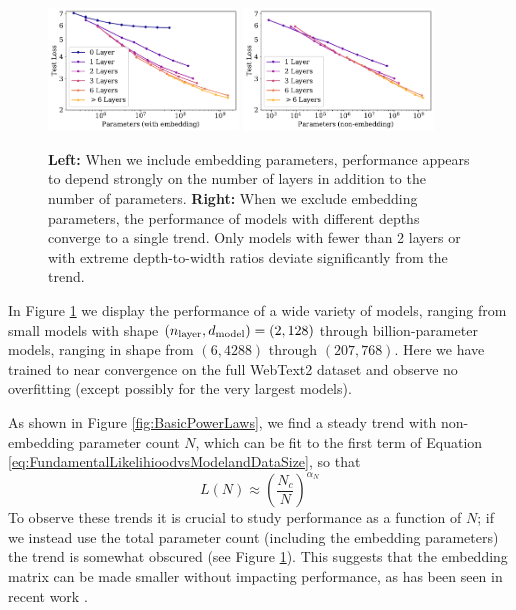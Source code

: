\documentclass[english]{article}
\newcommand{\be}{\begin{equation}}
\newcommand{\ee}{\end{equation}}
\begin{document}
\begin{figure}
\noindent \centering{}
\includegraphics[width=0.45\textwidth]{PerfVsModelSizeAllParams}
\includegraphics[width=0.45\textwidth]{PerfVsModelSizeNonEmbed}
\caption[Comparison of performance trend when including or excluding embeddings]{
{\bf Left:} When we include embedding parameters, performance appears to depend strongly on the number of layers in addition to the number of parameters.
{\bf Right:} When we exclude embedding parameters, the performance of models with different depths converge to a single trend. Only models with fewer than 2 layers or with extreme depth-to-width ratios deviate significantly from the trend.  \label{fig:PerformancevsModelSizeBody}}
\end{figure}


In Figure \ref{fig:PerformancevsModelSizeBody} we display the performance of a wide variety of models, ranging from small models with shape $(n_{\rm layer}, d_{{\rm model}}) = (2, 128)$ through billion-parameter models, ranging in shape from $(6, 4288)$ through $(207, 768)$.  Here we have trained to near convergence on the full WebText2 dataset and observe no overfitting (except possibly for the very largest models).

As shown in  Figure \ref{fig:BasicPowerLaws}, we find a steady trend with non-embedding parameter count $N$, which can be fit to the first term of Equation \eqref{eq:FundamentalLikelihioodvsModelandDataSize}, so that
\be
L(N) \approx \left( \frac{N_c}{N} \right)^{ \alpha_N }
\ee  
To observe these trends it is crucial to study performance as a function of $N$; if we instead use the total parameter count (including the embedding parameters) the trend is somewhat obscured (see Figure \ref{fig:PerformancevsModelSizeBody}).  This suggests that the embedding matrix can be made smaller without impacting performance, as has been seen in recent work \cite{lan2019albert}.
\end{document}
